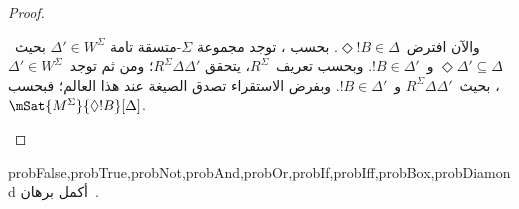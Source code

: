 \documentclass[../../../include/open-logic-section]{subfiles}
\begin{document}
\begin{proof}
\begin{enumerate}
{{{          والآن افترض~$\Diamond !B \in \Delta$. بحسب
          ، توجد مجموعة $\Sigma$-متسقة تامة
          $\Delta' \in W^\Sigma$ بحيث~$\Diamond\Delta' \subseteq
          \Delta$ و~$!B \in \Delta'$. وبحسب تعريف~$R^\Sigma$، يتحقق
          $R^\Sigma \Delta\Delta'$؛ ومن ثم توجد~$\Delta' \in W^\Sigma$
          بحيث~$R^\Sigma \Delta\Delta'$ و~$!B \in \Delta'$.
          وبفرض الاستقراء تصدق الصيغة عند هذا العالم؛ فبحسب
          ،
          $\mSat{M^\Sigma}{\Diamond !B}[\Delta]$.}}}{}
  \end{enumerate}
\end{proof}

\begin{probtag}{probFalse,probTrue,probNot,probAnd,probOr,probIf,probIff,probBox,probDiamond}
  أكمل برهان~.
\end{probtag}
\end{document}
